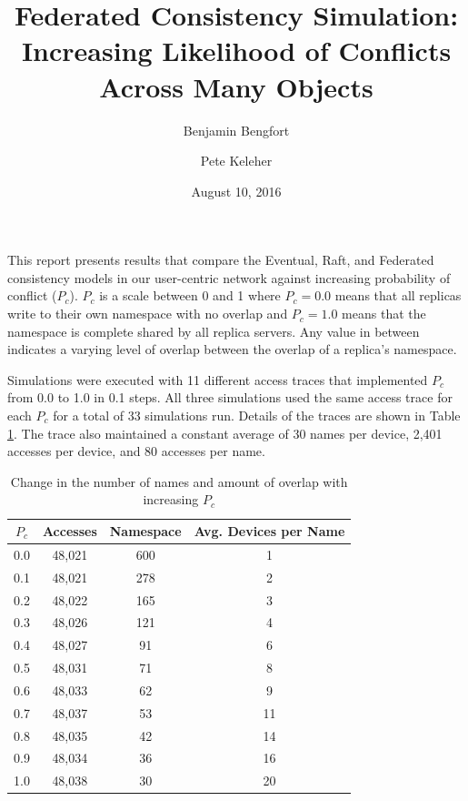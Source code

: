 \documentclass[11pt,letterpaper]{article}
\title{Federated Consistency Simulation: \\
 Increasing Likelihood of Conflicts Across Many Objects}
\date{August 10, 2016}
\author[ ]{Benjamin Bengfort}
\author[ ]{Pete Keleher}
\affil[ ]{Department of Computer Science}
\affil[ ]{University of Maryland}
\affil[ ]{\textit{\{bengfort,keleher\}@cs.umd.edu}}
\begin{document}
\maketitle

This report presents results that compare the Eventual, Raft, and Federated consistency models in our user-centric network against increasing probability of conflict ($P_c$). $P_c$ is a scale between 0 and 1 where $P_c = 0.0$ means that all replicas write to their own namespace with no overlap and $P_c = 1.0$ means that the namespace is complete shared by all replica servers. Any value in between indicates a varying level of overlap between the overlap of a replica's namespace.

Simulations were executed with 11 different access traces that implemented $P_c$ from 0.0 to 1.0 in 0.1 steps. All three simulations used the same access trace for each $P_c$ for a total of 33 simulations run. Details of the traces are shown in Table \ref{table:traces}. The trace also maintained a constant average of 30 names per device, 2,401 accesses per device, and 80 accesses per name.

\begin{table}[!h]
\centering
\begin{tabular}{ | c | c | c | c |}

    \hline
    $P_c$ & Accesses & Namespace & Avg. Devices per Name \\
    \hline
    0.0 & 48,021 & 600 &  1 \\
    0.1 & 48,021 & 278 &  2 \\
    0.2 & 48,022 & 165 &  3 \\
    0.3 & 48,026 & 121 &  4 \\
    0.4 & 48,027 & 91  &  6 \\
    0.5 & 48,031 & 71  &  8 \\
    0.6 & 48,033 & 62  &  9 \\
    0.7 & 48,037 & 53  & 11 \\
    0.8 & 48,035 & 42  & 14 \\
    0.9 & 48,034 & 36  & 16 \\
    1.0 & 48,038 & 30  & 20 \\
    \hline

\end{tabular}

\caption{\textsf{Change in the number of names and amount of overlap with increasing $P_c$}}
\label{table:traces}
\end{table}
\end{document}
